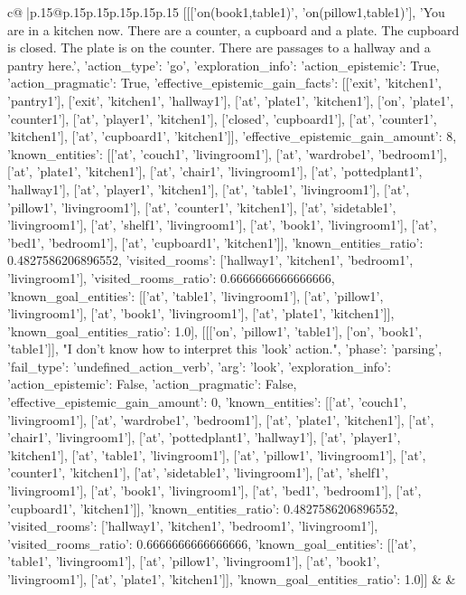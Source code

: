 \documentclass{article}
\begin{document}
{\begin{supertabular}{c@{$\;$}|p{.15\linewidth}@{}p{.15\linewidth}p{.15\linewidth}p{.15\linewidth}p{.15\linewidth}p{.15\linewidth}}
{{{	 [[['on(book1,table1)', 'on(pillow1,table1)'], 'You are in a kitchen now. There are a counter, a cupboard and a plate. The cupboard is closed. The plate is on the counter. There are passages to a hallway and a pantry here.', {'action_type': 'go', 'exploration_info': {'action_epistemic': True, 'action_pragmatic': True, 'effective_epistemic_gain_facts': [['exit', 'kitchen1', 'pantry1'], ['exit', 'kitchen1', 'hallway1'], ['at', 'plate1', 'kitchen1'], ['on', 'plate1', 'counter1'], ['at', 'player1', 'kitchen1'], ['closed', 'cupboard1'], ['at', 'counter1', 'kitchen1'], ['at', 'cupboard1', 'kitchen1']], 'effective_epistemic_gain_amount': 8, 'known_entities': [['at', 'couch1', 'livingroom1'], ['at', 'wardrobe1', 'bedroom1'], ['at', 'plate1', 'kitchen1'], ['at', 'chair1', 'livingroom1'], ['at', 'pottedplant1', 'hallway1'], ['at', 'player1', 'kitchen1'], ['at', 'table1', 'livingroom1'], ['at', 'pillow1', 'livingroom1'], ['at', 'counter1', 'kitchen1'], ['at', 'sidetable1', 'livingroom1'], ['at', 'shelf1', 'livingroom1'], ['at', 'book1', 'livingroom1'], ['at', 'bed1', 'bedroom1'], ['at', 'cupboard1', 'kitchen1']], 'known_entities_ratio': 0.4827586206896552, 'visited_rooms': ['hallway1', 'kitchen1', 'bedroom1', 'livingroom1'], 'visited_rooms_ratio': 0.6666666666666666, 'known_goal_entities': [['at', 'table1', 'livingroom1'], ['at', 'pillow1', 'livingroom1'], ['at', 'book1', 'livingroom1'], ['at', 'plate1', 'kitchen1']], 'known_goal_entities_ratio': 1.0}}], [[['on', 'pillow1', 'table1'], ['on', 'book1', 'table1']], "I don't know how to interpret this 'look' action.", {'phase': 'parsing', 'fail_type': 'undefined_action_verb', 'arg': 'look', 'exploration_info': {'action_epistemic': False, 'action_pragmatic': False, 'effective_epistemic_gain_amount': 0, 'known_entities': [['at', 'couch1', 'livingroom1'], ['at', 'wardrobe1', 'bedroom1'], ['at', 'plate1', 'kitchen1'], ['at', 'chair1', 'livingroom1'], ['at', 'pottedplant1', 'hallway1'], ['at', 'player1', 'kitchen1'], ['at', 'table1', 'livingroom1'], ['at', 'pillow1', 'livingroom1'], ['at', 'counter1', 'kitchen1'], ['at', 'sidetable1', 'livingroom1'], ['at', 'shelf1', 'livingroom1'], ['at', 'book1', 'livingroom1'], ['at', 'bed1', 'bedroom1'], ['at', 'cupboard1', 'kitchen1']], 'known_entities_ratio': 0.4827586206896552, 'visited_rooms': ['hallway1', 'kitchen1', 'bedroom1', 'livingroom1'], 'visited_rooms_ratio': 0.6666666666666666, 'known_goal_entities': [['at', 'table1', 'livingroom1'], ['at', 'pillow1', 'livingroom1'], ['at', 'book1', 'livingroom1'], ['at', 'plate1', 'kitchen1']], 'known_goal_entities_ratio': 1.0}}]] 
	  } 
	   } 
	   } 
	 & & \\ 
 


\end{supertabular}}
\end{document}
